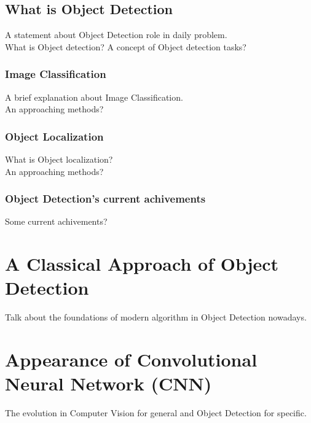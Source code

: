 \documentclass[12pt]{report}
\begin{document}
\section{What is Object Detection}
A statement about Object Detection role in daily problem.\\
What is Object detection? A concept of Object detection tasks?

\subsection{Image Classification}
A brief explanation about Image Classification. \\
An approaching methods? 

\subsection{Object Localization}
What is Object localization? \\
An approaching methods?

\subsection{Object Detection's current achivements}
Some current achivements? 


\chapter{A Classical Approach of Object Detection}
Talk about the foundations of modern algorithm in Object Detection nowadays.

\newpage


\chapter{Appearance of Convolutional Neural Network (CNN)}
The evolution in Computer Vision for general and Object Detection for specific.

\newpage
\end{document}
